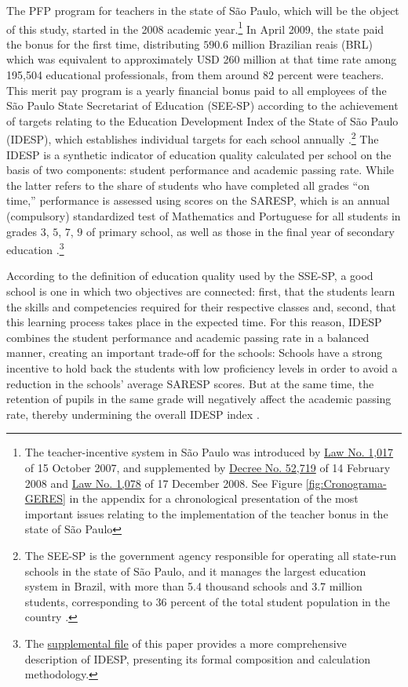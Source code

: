 \documentclass[a4paper, 12pt]{article}
\begin{document}
The PFP program for teachers in the state of São Paulo, which will be the object of this study, started in the 2008 academic year.\footnote{The teacher-incentive system in São Paulo was introduced by \href{http://tiny.cc/4opsaz}{Law No. 1,017} of 15 October 2007, and supplemented by \href{http://tiny.cc/ympsaz}{Decree No. 52,719} of 14 February 2008 and \href{http://tiny.cc/0wpsaz}{Law No. 1,078} of 17 December 2008. See Figure \ref{fig:Cronograma-GERES} in the appendix for a chronological presentation of the most important issues relating to the implementation of the teacher bonus in the state of São Paulo} In April 2009, the state paid the bonus for the first time, distributing $590.6$ million Brazilian reais (BRL) \textemdash which was equivalent to approximately USD 260 million at that time rate \textemdash among 195,504 educational professionals, from them around $82$ percent were teachers. This merit pay program is a yearly financial bonus paid to all employees of the São Paulo State Secretariat of Education (SEE-SP) according to the achievement of targets relating to the Education Development Index of the State of São Paulo (IDESP), which establishes individual targets for each school annually \citep{bresolin2018avaliaccao}.\footnote{The SEE-SP is the government agency responsible for operating all state-run schools in the state of São Paulo, and it manages the largest education system in Brazil, with more than 5.4 thousand schools and 3.7 million students, corresponding to $36$ percent of the total student population in the country \citep{Sinopse2018}.} The IDESP is a synthetic indicator of education quality calculated per school on the basis of two components: student performance and academic passing rate. While the latter refers to the share of students who have completed all grades ``on time,'' performance is assessed using scores on the SARESP, which is an annual (compulsory) standardized test of Mathematics and Portuguese for all students in grades $3$, $5$, $7$, $9$ of primary school, as well as those in the final year of secondary education \citep{oshiro2015impacto}.\footnote{The \hyperref[SuppMaterial]{supplemental file} of this paper provides a more comprehensive description of IDESP, presenting its formal composition and calculation methodology.}



According to the definition of education quality used by the SSE-SP, a good school is one in which two objectives are connected: first, that the students learn the skills and competencies required for their respective classes and, second, that this learning process takes place in the expected time. For this reason, IDESP combines the student performance and academic passing rate in a balanced manner, creating an important trade-off for the schools: Schools have a strong incentive to hold back the students with low proficiency levels in order to avoid a reduction in the schools’ average SARESP scores. But at the same time, the retention of pupils in the same grade will negatively affect the academic passing rate, thereby undermining the overall IDESP index \citep{SEESP2018}.
\end{document}

